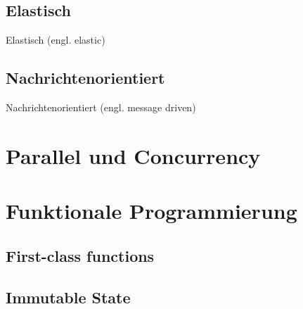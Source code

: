 
\subsection{Elastisch}
Elastisch (engl. elastic)

\pagebreak

\subsection{Nachrichtenorientiert}
Nachrichtenorientiert (engl. message driven)


\pagebreak

%
%
%

\section{Parallel und Concurrency}
\section{Funktionale Programmierung}
\subsection{First-class functions}
\subsection{Immutable State}